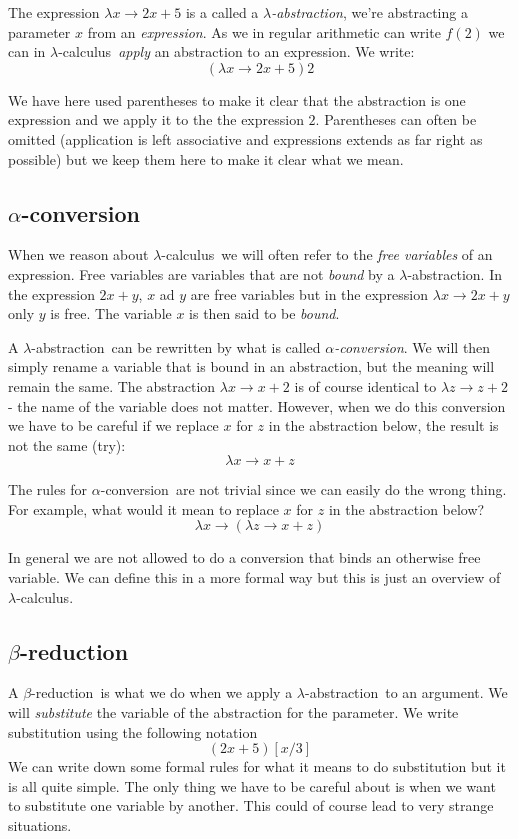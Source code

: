 \documentclass[a4paper,11pt]{article}
\newcommand{\lamc}[0]{$\lambda$-calculus}
\newcommand{\lama}[0]{$\lambda$-abstraction}
\newcommand{\alphac}[0]{$\alpha$-conversion}
\newcommand{\betar}[0]{$\beta$-reduction}
\begin{document}
The expression $\lambda x \rightarrow 2x + 5$ is a called a {\em
  \lama}, we're abstracting a parameter $x$ from an {\em
  expression}. As we in regular arithmetic can write $f(2)$ we can in
\lamc\ {\em apply} an abstraction to an expression. We
write: $$(\lambda x \rightarrow 2x + 5) 2$$

We have here used parentheses to make it clear that the abstraction is
one expression and we apply it to the the expression $2$. Parentheses
can often be omitted (application is left associative and expressions
extends as far right as possible) but we keep them here to make it
clear what we mean.


\subsection{\alphac}

When we reason about \lamc\ we will often refer to the {\em free
  variables} of an expression. Free variables are variables that are
not {\em bound} by a \lama. In the expression $2x + y$, $x$ ad $y$ are
free variables but in the expression $\lambda x \rightarrow 2x + y$
only $y$ is free. The variable $x$ is then said to be {\em bound}.

A \lama\ can be rewritten by what is called {\em \alphac}. We will then
simply rename a variable that is bound in an abstraction, but the
meaning will remain the same. The abstraction
$\lambda x \rightarrow x +2$ is of course identical to
$\lambda z \rightarrow z +2$ - the name of the variable does not
matter. However, when we do this conversion we have to be careful if
we replace $x$ for $z$ in the abstraction below, the result is not the
same (try):$$\lambda x \rightarrow x + z$$

The rules for \alphac\ are not trivial since we can easily do the
wrong thing. For example, what would it mean to replace $x$ for $z$ in
the abstraction below? $$\lambda x \rightarrow (\lambda z \rightarrow x + z)$$

In general we are not allowed to do a conversion that binds an
otherwise free variable. We can define this in a more formal way but
this is just an overview of \lamc.


\subsection{\betar}

A \betar\ is what we do when we apply a \lama\ to an argument. We will
{\em substitute} the variable of the abstraction for the parameter. We
write substitution using the following notation $$(2x + 5)[x/3]$$ We
can write down some formal rules for what it means to do substitution
but it is all quite simple. The only thing we have to be careful
about is when we want to substitute one variable by another. This
could of course lead to very strange situations. 
\end{document}
